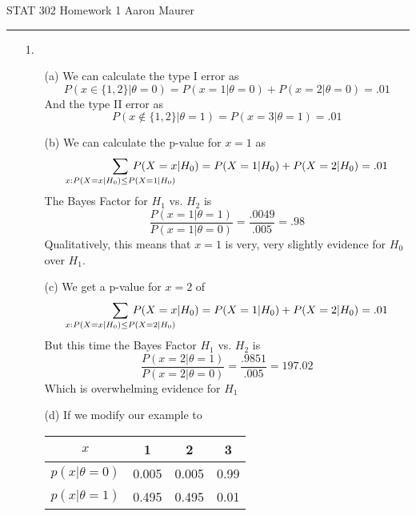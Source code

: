 \documentclass[11pt]{article}
\theoremstyle{definition}
\begin{document}
STAT 302 Homework 1 \hfill Aaron Maurer
\vspace{2mm}
\hrule
\vspace{2mm}

\begin{itemize}
    \item[1.]
        \begin{itemize}
            \item[(a)]
                We can calculate the type I error as
                \[P(x\in\{1,2\}|\theta=0) = P(x=1|\theta=0) + P(x=2|\theta=0) = .01\]
                And the type II error as 
                \[P(x\not\in\{1,2\}|\theta=1) = P(x=3|\theta=1) =.01\]
            \item[(b)]
                We can calculate the p-value for $x=1$ as 
                \[ \sum_{x: P(X=x|H_0)\leq P(X=1|H_0)} \hspace{-4em} P(X=x|H_0) = P(X=1|H_0) + P(X=2|H_0) = .01\]
                The Bayes Factor for $H_1$ vs. $H_2$ is
                \[\frac{P(x=1|\theta=1)}{P(x=1|\theta=0)} =\frac{.0049}{.005} = .98\]
                Qualitatively, this means that $x=1$ is very, very slightly evidence for $H_0$ over $H_1$.
            \item[(c)]
                We get a p-value for $x=2$ of 
                \[ \sum_{x: P(X=x|H_0)\leq P(X=2|H_0)} \hspace{-4em} P(X=x|H_0) = P(X=1|H_0) + P(X=2|H_0) = .01\]
                But this time the Bayes Factor $H_1$ vs. $H_2$ is
                \[\frac{P(x=2|\theta=1)}{P(x=2|\theta=0)} =\frac{.9851}{.005} = 197.02\]
                Which is overwhelming evidence for $H_1$
            \item[(d)]
                If we modify our example to \\
                \begin{table}[h!]
                \center
                \begin{tabular}{c|c|c|c}
                $x$ & 1 & 2 & 3 \\ \hline
                $p(x|\theta=0)$ & 0.005 & 0.005 & 0.99 \\
                $p(x|\theta=1)$ & 0.495 & 0.495 & 0.01 
                \end{tabular}
                \end{table}


\end{itemize}
\end{itemize}
\end{document}
